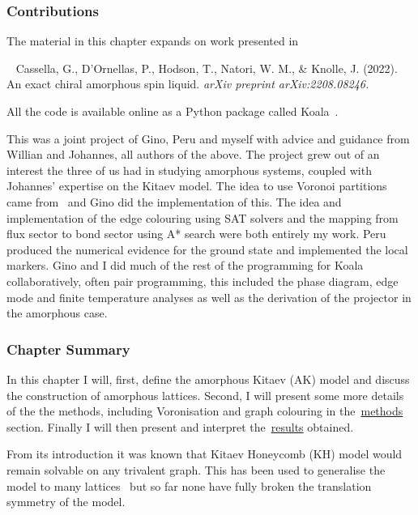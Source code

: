 \hypertarget{ak-contributions}{%
\subsubsection{Contributions}\label{ak-contributions}}

The material in this chapter expands on work presented in

~\autocite{cassellaExactChiralAmorphous2022} Cassella, G., D'Ornellas, P., Hodson, T., Natori, W. M., \& Knolle, J. (2022). An exact chiral amorphous spin liquid. \emph{arXiv preprint arXiv:2208.08246.}

All the code is available online as a Python package called Koala~\autocite{hodsonKoalaKitaevAmorphous2022}.

This was a joint project of Gino, Peru and myself with advice and guidance from Willian and Johannes, all authors of the above. The project grew out of an interest the three of us had in studying amorphous systems, coupled with Johannes' expertise on the Kitaev model. The idea to use Voronoi partitions came from~\autocite{marsalTopologicalWeaireThorpe2020} and Gino did the implementation of this. The idea and implementation of the edge colouring using SAT solvers and the mapping from flux sector to bond sector using A* search were both entirely my work. Peru produced the numerical evidence for the ground state and implemented the local markers. Gino and I did much of the rest of the programming for Koala collaboratively, often pair programming, this included the phase diagram, edge mode and finite temperature analyses as well as the derivation of the projector in the amorphous case.

\hypertarget{ak-summary}{%
\subsubsection{Chapter Summary}\label{ak-summary}}

In this chapter I will, first, define the amorphous Kitaev (AK) model and discuss the construction of amorphous lattices. Second, I will present some more details of the the methods, including Voronisation and graph colouring in the~\protect\hyperlink{amk-methods}{methods} section. Finally I will then present and interpret the~\protect\hyperlink{amk-results}{results} obtained.

From its introduction it was known that Kitaev Honeycomb (KH) model would remain solvable on any trivalent graph. This has been used to generalise the model to many lattices~\autocite{eschmannThermodynamicClassificationThreedimensional2020,Yao2009,eschmann2019thermodynamics,Peri2020} but so far none have fully broken the translation symmetry of the model.

